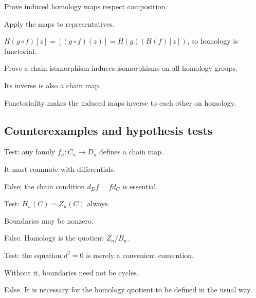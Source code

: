 \begin{exercise}[Composition]\label{exr:viii16-ped-08}
Prove induced homology maps respect composition.
\end{exercise}
\begin{hint}
Apply the maps to representatives.
\end{hint}
\begin{solution}
$H(g\circ f)[z]=[(g\circ f)(z)]=H(g)(H(f)[z])$, so homology is functorial.
\end{solution}

\begin{exercise}\label{exr:viii16-ped-09}
Prove a chain isomorphism induces isomorphisms on all homology groups.
\end{exercise}
\begin{hint}
Its inverse is also a chain map.
\end{hint}
\begin{solution}
Functoriality makes the induced maps inverse to each other on homology.
\end{solution}

\subsection*{Counterexamples and hypothesis tests}

\begin{exercise}\label{exr:viii16-ped-10}
Test: any family $f_n:C_n\to D_n$ defines a chain map.
\end{exercise}
\begin{hint}
It must commute with differentials.
\end{hint}
\begin{solution}
False; the chain condition $d_Df=fd_C$ is essential.
\end{solution}

\begin{exercise}\label{exr:viii16-ped-11}
Test: $H_n(C)=Z_n(C)$ always.
\end{exercise}
\begin{hint}
Boundaries may be nonzero.
\end{hint}
\begin{solution}
False. Homology is the quotient $Z_n/B_n$.
\end{solution}

\begin{exercise}[$d^2=0$ optional]\label{exr:viii16-ped-12}
Test: the equation $d^2=0$ is merely a convenient convention.
\end{exercise}
\begin{hint}
Without it, boundaries need not be cycles.
\end{hint}
\begin{solution}
False. It is necessary for the homology quotient to be defined in the usual way.
\end{solution}

